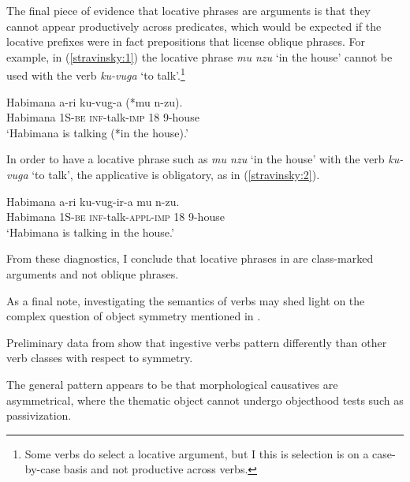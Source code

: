 \documentclass[output=paper]{langsci/langscibook}
\begin{document}
 The final piece of evidence that locative phrases are arguments is that they cannot appear productively across predicates, which would be expected if the locative prefixes were in fact prepositions that license oblique phrases. For example, in (\ref{stravinsky:1}) the locative phrase \emph{mu nzu} `in the house' cannot be used with the verb \emph{ku-vuga} `to talk'.\footnote{Some verbs do select a locative argument, but I this is selection is on a case-by-case basis and not productive across verbs.}
 \begin{exe}
\ex\label{stravinsky:1}\gll Habimana a-ri ku-vug-a (*mu n-zu).\\
			Habimana 1S-{\scshape be} {\scshape inf}-talk-{\scshape imp} \phantom{(*}18 9-house\\%
				\glt `Habimana is talking (*in the house).'
\end{exe}
In order to have a locative phrase such as \emph{mu nzu} `in the house' with the verb \emph{ku-vuga} `to talk', the applicative is obligatory, as in (\ref{stravinsky:2}).
\begin{exe}
\ex\label{stravinsky:2}\gll Habimana a-ri ku-vug-ir-a mu n-zu.\\
			Habimana 1S-{\scshape be} {\scshape inf}-talk-{\scshape appl-imp} 18 9-house\\
				\glt `Habimana is talking in the house.'
\end{exe}
 From these diagnostics, I conclude that  locative phrases in  are class-marked arguments and not oblique phrases. 
 
\iffalse 
  As a final note, investigating the semantics of verbs may shed light on the complex question of  object symmetry mentioned in . 
 
  Preliminary data from  show that ingestive verbs pattern differently than other verb classes with respect to symmetry. 
 
  The general pattern appears to be that morphological causatives are asymmetrical, where the thematic object cannot undergo objecthood tests such as passivization.
 
\end{document}
